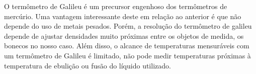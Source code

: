 O termômetro de Galileu é um precursor engenhoso dos termômetros de mercúrio. Uma vantagem interessante deste em relação ao anterior é que não depende do uso de metais pesados. Porém, a resolução do termômetro de galileu depende de ajustar densidades muito próximas entre os objetos de medida, os bonecos no nosso caso. Além disso, o alcance de temperaturas mensuráveis com um termômetro de Galileu é limitado, não pode medir temperaturas próximas à temperatura de ebulição ou fusão do líquido utilizado.
